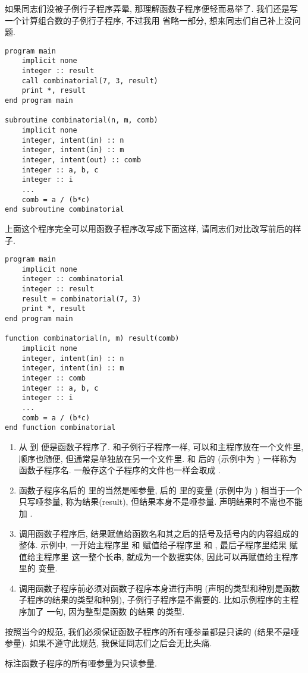 如果同志们没被子例行子程序弄晕, 那理解函数子程序便轻而易举了. 我们还是写一个计算组合数的子例行子程序, 不过我用  省略一部分, 想来同志们自己补上没问题. 
\begin{lstlisting} 
program main
    implicit none
    integer :: result
    call combinatorial(7, 3, result)
    print *, result
end program main

subroutine combinatorial(n, m, comb)
    implicit none
    integer, intent(in) :: n
    integer, intent(in) :: m
    integer, intent(out) :: comb
    integer :: a, b, c
    integer :: i
    ... 
    comb = a / (b*c)
end subroutine combinatorial
\end{lstlisting} 
上面这个程序完全可以用函数子程序改写成下面这样, 请同志们对比改写前后的样子. 
\begin{lstlisting} 
program main
    implicit none
    integer :: combinatorial
    integer :: result
    result = combinatorial(7, 3)
    print *, result
end program main

function combinatorial(n, m) result(comb)
    implicit none
    integer, intent(in) :: n
    integer, intent(in) :: m
    integer :: comb
    integer :: a, b, c
    integer :: i
    ... 
    comb = a / (b*c)
end function combinatorial
\end{lstlisting} 
\begin{enumerate} 
    \item 从  到  便是函数子程序了. 和子例行子程序一样, 可以和主程序放在一个文件里, 顺序也随便, 但通常是单独放在另一个文件里.   和  后的  (示例中为 ) 一样称为函数子程序名. 一般存这个子程序的文件也一样会取成 . 
    \item 函数子程序名后的 \ttt{()} 里的当然是哑参量, \ttt{()} 后的  里的变量  (示例中为 ) 相当于一个只写哑参量, 称为结果(result), 但结果本身不是哑参量. 声明结果时不需也不能加 . 
    \item 调用函数子程序后, 结果赋值给函数名和其之后的括号及括号内的内容组成的整体. 示例中, 一开始主程序里  和  赋值给子程序里  和 , 最后子程序里结果  赋值给主程序里  这一整个长串,  就成为一个数据实体, 因此可以再赋值给主程序里的  变量. 
    \item 调用函数子程序前必须对函数子程序本身进行声明 (声明的类型和种别是函数子程序的结果的类型和种别), 子例行子程序是不需要的. 比如示例程序的主程序加了  一句, 因为整型是函数  的结果  的类型. 
\end{enumerate} 
按照当今的规范, 我们必须保证函数子程序的所有哑参量都是只读的 (结果不是哑参量). 如果不遵守此规范, 我保证同志们之后会无比头痛. 
\begin{convention} 
    标注函数子程序的所有哑参量为只读参量. 
\end{convention} 


